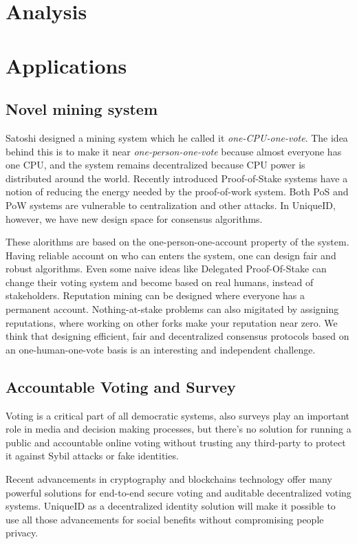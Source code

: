 \documentclass[conference]{IEEEtran}
\begin{document}
\section{Analysis}

 
\section{Applications}

\subsection{Novel mining system}
Satoshi designed a mining system which he called it \textit{one-CPU-one-vote}. The idea behind this is to make it near \textit{one-person-one-vote} because almost everyone has one CPU, and the system remains decentralized because CPU power is distributed around the world. Recently introduced Proof-of-Stake systems have a notion of reducing the energy needed by the proof-of-work system. Both PoS and PoW systems are vulnerable to centralization and other attacks. In UniqueID, however, we have new design space for consensus algorithms.


These alorithms are based on the one-person-one-account property of the system. Having reliable account on who can enters the system, one can design fair and robust algorithms. Even some naive ideas like Delegated Proof-Of-Stake can change their voting system and become based on real humans, instead of stakeholders. Reputation mining can be designed where everyone has a permanent account. Nothing-at-stake problems can also migitated by assigning reputations, where working on other forks make your reputation near zero. We think that designing efficient, fair and decentralized consensus protocols based on an one-human-one-vote basis is an interesting and independent challenge.

\subsection{Accountable Voting and Survey}
Voting is a critical part of all democratic systems, also surveys play an important role in media and decision making processes, but there's no solution for running a public and accountable online voting without trusting any third-party to protect it against Sybil attacks or fake identities.


Recent advancements in cryptography and blockchains technology offer many powerful solutions for end-to-end secure voting and auditable decentralized voting systems. UniqueID as a decentralized identity solution will make it possible to use all those advancements for social benefits without compromising people privacy.
\end{document}
